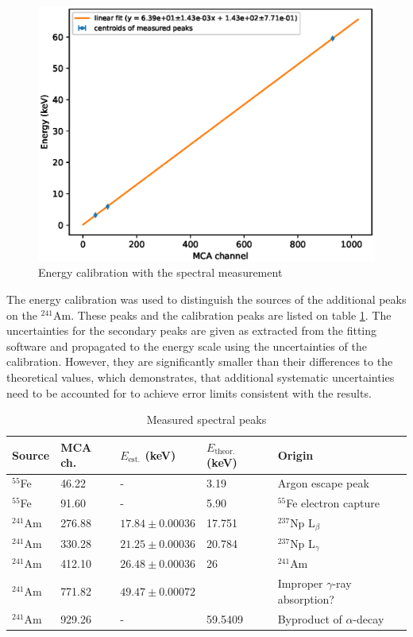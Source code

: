 \documentclass[a4paper]{article}
\begin{document}
\begin{figure}[ht!]
\centering
\includegraphics[width=\textwidth]{fig/python/spectral_calibration.eps}
\caption{Energy calibration with the spectral measurement}
\label{fig:spectral_calibration}
\end{figure}

\FloatBarrier
The energy calibration was used to distinguish the sources of the additional peaks on the $^{241}$Am.
These peaks and the calibration peaks are listed on table \ref{table:peaks}.
The uncertainties for the secondary peaks are given as extracted from the fitting software and propagated to the energy scale using the uncertainties of the calibration.
However, they are significantly smaller than their differences to the theoretical values, which demonstrates, that additional systematic uncertainties need to be accounted for to achieve error limits consistent with the results.

\begin{table}[ht!]
\centering
\caption{Measured spectral peaks}
\begin{tabular}{lllll}
Source	& MCA ch.	& $E_\text{est.}$ (keV)	& $E_\text{theor.}$ (keV)	& Origin \\
\hline
$^{55}$Fe	& 46.22			& -			& 3.19 			& Argon escape peak \cite{winkler_gaseous_2015} \\
$^{55}$Fe	& 91.60			& -			& 5.90 			& $^{55}$Fe electron capture \cite{winkler_gaseous_2015} \\
$^{241}$Am	& 276.88			& $17.84\pm0.00036$		& 17.751			& $^{237}$Np L$_\beta$ \cites{maeda_peak_2015}{am241_spectrum} \\
$^{241}$Am	& 330.28			& $21.25\pm0.00036$		& 20.784			& $^{237}$Np L$_\gamma$ \cites{maeda_peak_2015}{am241_spectrum} \\
$^{241}$Am	& 412.10			& $26.48\pm0.00036$		& 26			& $^{241}$Am \cite{am241_spectrum} \\
$^{241}$Am	& 771.82			& $49.47\pm0.00072$		&				& Improper $\gamma$-ray absorption? \\
$^{241}$Am	& 929.26			& -			& 59.5409		& Byproduct of $\alpha$-decay \cite{winkler_gaseous_2015} \\
\end{tabular}
\label{table:peaks}
\end{table}
\end{document}
